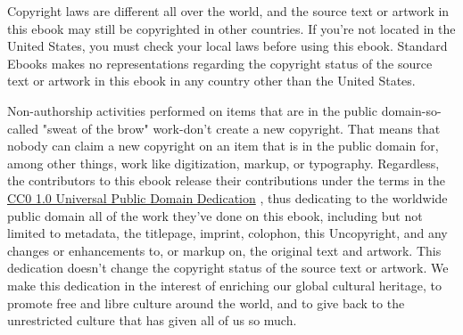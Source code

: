 \documentclass[11pt,a4paper]{article}
\begin{document}
Copyright laws are different all over the world, and the source text or artwork in this ebook may still be copyrighted in other countries. If you're not located in the United States, you must check your local laws before using this ebook. Standard Ebooks makes no representations regarding the copyright status of the source text or artwork in this ebook in any country other than the United States.

Non-authorship activities performed on items that are in the public domain-so-called "sweat of the brow" work-don't create a new copyright. That means that nobody can claim a new copyright on an item that is in the public domain for, among other things, work like digitization, markup, or typography. Regardless, the contributors to this ebook release their contributions under the terms in the \href{https://creativecommons.org/publicdomain/zero/1.0/}{CC0 1.0 Universal Public Domain Dedication} , thus dedicating to the worldwide public domain all of the work they've done on this ebook, including but not limited to metadata, the titlepage, imprint, colophon, this Uncopyright, and any changes or enhancements to, or markup on, the original text and artwork. This dedication doesn't change the copyright status of the source text or artwork. We make this dedication in the interest of enriching our global cultural heritage, to promote free and libre culture around the world, and to give back to the unrestricted culture that has given all of us so much.
\end{document}
